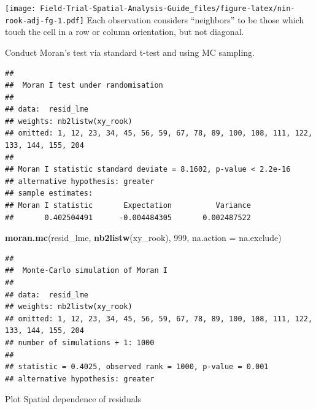 \documentclass[
]{book}
\newenvironment{Shaded}{\begin{snugshade}}{\end{snugshade}}
\newcommand{\AttributeTok}[1]{\textcolor[rgb]{0.13,0.29,0.53}{#1}}
\newcommand{\DecValTok}[1]{\textcolor[rgb]{0.00,0.00,0.81}{#1}}
\newcommand{\FunctionTok}[1]{\textcolor[rgb]{0.13,0.29,0.53}{\textbf{#1}}}
\newcommand{\NormalTok}[1]{#1}
\newcommand{\OtherTok}[1]{\textcolor[rgb]{0.56,0.35,0.01}{#1}}
\newcommand{\SpecialCharTok}[1]{\textcolor[rgb]{0.81,0.36,0.00}{\textbf{#1}}}
\begin{document}
\texttt{[image: Field-Trial-Spatial-Analysis-Guide\_files/figure-latex/nin-rook-adj-fg-1.pdf]}
Each observation considers ``neighbors'' to be those which touch the cell in a row or column orientation, but not diagonal.

Conduct Moran's test via standard t-test and using MC sampling.

\begin{Shaded}
\end{Shaded}

\begin{verbatim}
## 
##  Moran I test under randomisation
## 
## data:  resid_lme  
## weights: nb2listw(xy_rook) 
## omitted: 1, 12, 23, 34, 45, 56, 59, 67, 78, 89, 100, 108, 111, 122, 133, 144, 155, 204   
## 
## Moran I statistic standard deviate = 8.1602, p-value < 2.2e-16
## alternative hypothesis: greater
## sample estimates:
## Moran I statistic       Expectation          Variance 
##       0.402504491      -0.004484305       0.002487522
\end{verbatim}

\begin{Shaded}
\begin{Highlighting}[]
\FunctionTok{moran.mc}\NormalTok{(resid\_lme, }\FunctionTok{nb2listw}\NormalTok{(xy\_rook), }\DecValTok{999}\NormalTok{, }\AttributeTok{na.action =}\NormalTok{ na.exclude)}
\end{Highlighting}
\end{Shaded}

\begin{verbatim}
## 
##  Monte-Carlo simulation of Moran I
## 
## data:  resid_lme 
## weights: nb2listw(xy_rook) 
## omitted: 1, 12, 23, 34, 45, 56, 59, 67, 78, 89, 100, 108, 111, 122, 133, 144, 155, 204 
## number of simulations + 1: 1000 
## 
## statistic = 0.4025, observed rank = 1000, p-value = 0.001
## alternative hypothesis: greater
\end{verbatim}

Plot Spatial dependence of residuals
\end{document}
